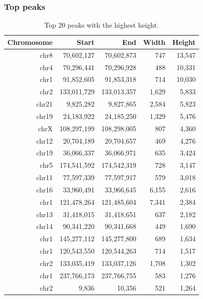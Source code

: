 \documentclass{article}
\begin{document}
\subsubsection{Top peaks}
{\scriptsize
\begin{longtable}{|r|r|r|r|r|}
\caption{Top 20 peaks with the highest height.} \\ 
  \hline
Chromosome & Start & End & Width & Height \\ 
  \hline
chr8 &  70,602,127 &  70,602,873 &   747 & 13,547 \\ 
   \rowcolor[gray]{0.9}chr4 &  70,296,441 &  70,296,928 &   488 & 10,331 \\ 
  chr1 &  91,852,605 &  91,853,318 &   714 & 10,030 \\ 
   \rowcolor[gray]{0.9}chr2 & 133,011,729 & 133,013,357 & 1,629 &  5,833 \\ 
  chr21 &   9,825,282 &   9,827,865 & 2,584 &  5,823 \\ 
   \rowcolor[gray]{0.9}chr19 &  24,183,922 &  24,185,250 & 1,329 &  5,476 \\ 
  chrX & 108,297,199 & 108,298,005 &   807 &  4,360 \\ 
   \rowcolor[gray]{0.9}chr12 &  20,704,189 &  20,704,657 &   469 &  4,276 \\ 
  chr19 &  36,066,337 &  36,066,971 &   635 &  3,424 \\ 
   \rowcolor[gray]{0.9}chr5 & 174,541,592 & 174,542,319 &   728 &  3,147 \\ 
  chr11 &  77,597,339 &  77,597,917 &   579 &  3,018 \\ 
   \rowcolor[gray]{0.9}chr16 &  33,960,491 &  33,966,645 & 6,155 &  2,616 \\ 
  chr1 & 121,478,264 & 121,485,604 & 7,341 &  2,384 \\ 
   \rowcolor[gray]{0.9}chr13 &  31,418,015 &  31,418,651 &   637 &  2,182 \\ 
  chr14 &  90,341,220 &  90,341,668 &   449 &  1,690 \\ 
   \rowcolor[gray]{0.9}chr1 & 145,277,112 & 145,277,800 &   689 &  1,634 \\ 
  chr1 & 120,543,550 & 120,544,263 &   714 &  1,517 \\ 
   \rowcolor[gray]{0.9}chr2 & 133,035,419 & 133,037,126 & 1,708 &  1,302 \\ 
  chr1 & 237,766,173 & 237,766,755 &   583 &  1,276 \\ 
   \rowcolor[gray]{0.9}chr2 &       9,836 &      10,356 &   521 &  1,264 \\ 
   \hline
\hline
\end{longtable}
}
\end{document}
